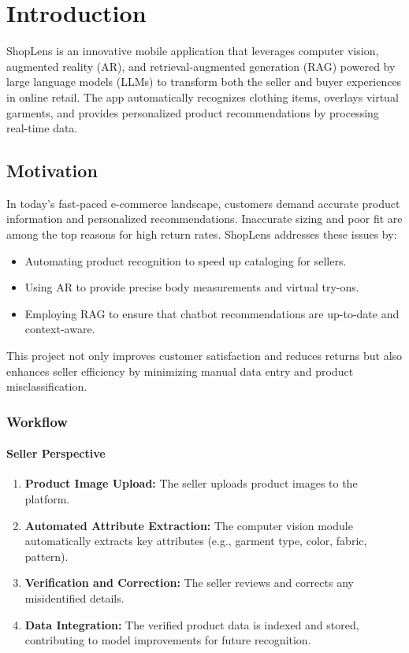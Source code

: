 \chapter{Introduction}
ShopLens is an innovative mobile application that leverages computer vision, augmented reality (AR), and retrieval-augmented generation (RAG) powered by large language models (LLMs) to transform both the seller and buyer experiences in online retail. The app automatically recognizes clothing items, overlays virtual garments, and provides personalized product recommendations by processing real-time data.

\section{Motivation}
In today’s fast-paced e-commerce landscape, customers demand accurate product information and personalized recommendations. Inaccurate sizing and poor fit are among the top reasons for high return rates. ShopLens addresses these issues by:
\begin{itemize}
    \item Automating product recognition to speed up cataloging for sellers.
    \item Using AR to provide precise body measurements and virtual try-ons.
    \item Employing RAG to ensure that chatbot recommendations are up-to-date and context-aware.
\end{itemize}
This project not only improves customer satisfaction and reduces returns but also enhances seller efficiency by minimizing manual data entry and product misclassification.

\subsection{Workflow}

\subsubsection{Seller Perspective}
\begin{enumerate}
    \item \textbf{Product Image Upload:} The seller uploads product images to the platform.
    \item \textbf{Automated Attribute Extraction:} The computer vision module automatically extracts key attributes (e.g., garment type, color, fabric, pattern).
    \item \textbf{Verification and Correction:} The seller reviews and corrects any misidentified details.
    \item \textbf{Data Integration:} The verified product data is indexed and stored, contributing to model improvements for future recognition.
\end{enumerate}

